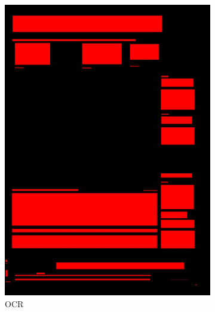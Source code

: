 \documentclass[aspectratio=1610]{beamer}
\begin{document}
\begin{frame}
  \begin{figure}
\centering
\begin{subfigure}{.25\textwidth}
  \centering
  \includegraphics[width=0.99\linewidth, clip=true, trim = 0mm 0mm 0mm 0mm]{figures/ocr/JIefsDa.jpg}
  \caption{OCR}
\end{subfigure}%
\begin{subfigure}{.25\textwidth}
  \centering

\end{subfigure}
\end{figure}
\end{frame}
\end{document}
